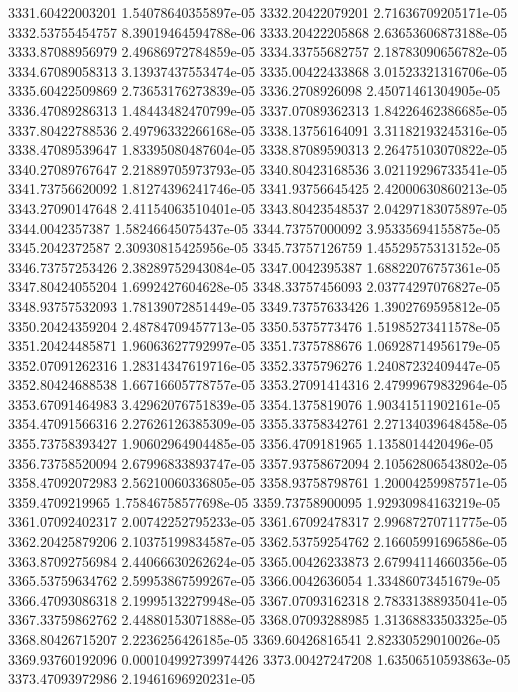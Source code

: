 {3331.60422003201 1.54078640355897e-05
3332.20422079201 2.71636709205171e-05
3332.53755454757 8.39019464594788e-06
3333.20422205868 2.63653606873188e-05
3333.87088956979 2.49686972784859e-05
3334.33755682757 2.18783090656782e-05
3334.67089058313 3.13937437553474e-05
3335.00422433868 3.01523321316706e-05
3335.60422509869 2.73653176273839e-05
3336.2708926098 2.45071461304905e-05
3336.47089286313 1.48443482470799e-05
3337.07089362313 1.84226462386685e-05
3337.80422788536 2.49796332266168e-05
3338.13756164091 3.31182193245316e-05
3338.47089539647 1.83395080487604e-05
3338.87089590313 2.26475103070822e-05
3340.27089767647 2.21889705973793e-05
3340.80423168536 3.02119296733541e-05
3341.73756620092 1.81274396241746e-05
3341.93756645425 2.42000630860213e-05
3343.27090147648 2.41154063510401e-05
3343.80423548537 2.04297183075897e-05
3344.0042357387 1.58246645075437e-05
3344.73757000092 3.95335694155875e-05
3345.2042372587 2.30930815425956e-05
3345.73757126759 1.45529575313152e-05
3346.73757253426 2.38289752943084e-05
3347.0042395387 1.68822076757361e-05
3347.80424055204 1.6992427604628e-05
3348.33757456093 2.03774297076827e-05
3348.93757532093 1.78139072851449e-05
3349.73757633426 1.3902769595812e-05
3350.20424359204 2.48784709457713e-05
3350.5375773476 1.51985273411578e-05
3351.20424485871 1.96063627792997e-05
3351.7375788676 1.06928714956179e-05
3352.07091262316 1.28314347619716e-05
3352.3375796276 1.24087232409447e-05
3352.80424688538 1.66716605778757e-05
3353.27091414316 2.47999679832964e-05
3353.67091464983 3.42962076751839e-05
3354.1375819076 1.90341511902161e-05
3354.47091566316 2.27626126385309e-05
3355.33758342761 2.27134039648458e-05
3355.73758393427 1.90602964904485e-05
3356.4709181965 1.1358014420496e-05
3356.73758520094 2.67996833893747e-05
3357.93758672094 2.10562806543802e-05
3358.47092072983 2.56210060336805e-05
3358.93758798761 1.20004259987571e-05
3359.4709219965 1.75846758577698e-05
3359.73758900095 1.92930984163219e-05
3361.07092402317 2.00742252795233e-05
3361.67092478317 2.99687270711775e-05
3362.20425879206 2.10375199834587e-05
3362.53759254762 2.16605991696586e-05
3363.87092756984 2.44066630262624e-05
3365.00426233873 2.67994114660356e-05
3365.53759634762 2.59953867599267e-05
3366.0042636054 1.33486073451679e-05
3366.47093086318 2.19995132279948e-05
3367.07093162318 2.78331388935041e-05
3367.33759862762 2.44880153071888e-05
3368.07093288985 1.31368833503325e-05
3368.80426715207 2.2236256426185e-05
3369.60426816541 2.82330529010026e-05
3369.93760192096 0.000104992739974426
3373.00427247208 1.63506510593863e-05
3373.47093972986 2.19461696920231e-05
}
